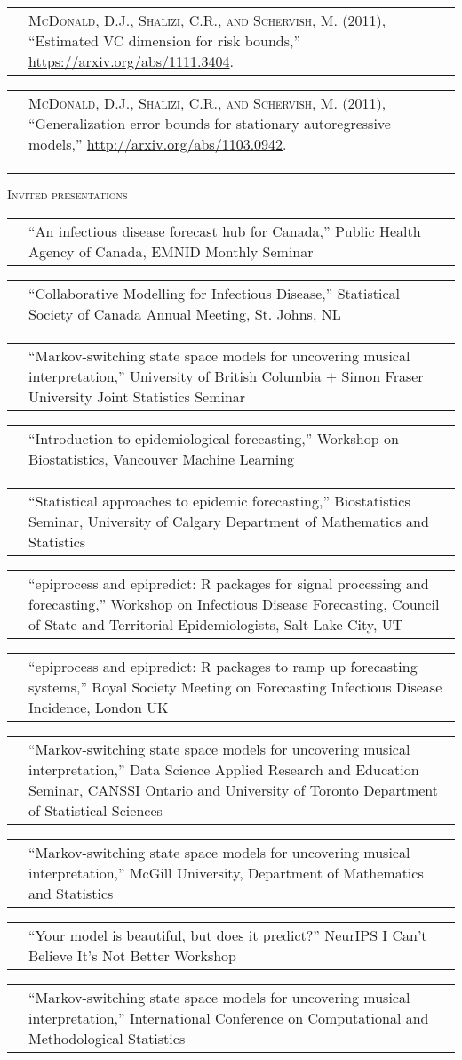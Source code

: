 \documentclass[11pt,letterpaper]{minimal/moderncv}
\makeatletter
\renewcommand{\section}[1]{  \par\addvspace{15pt}%
  \parbox[t]{\hintscolumnwidth}{\strut\raggedleft\raisebox{4pt}%
  {\rule{\hintscolumnwidth}{2pt}}}%
  \hspace{\separatorcolumnwidth}%
  \textsc{\Large #1}\par\nobreak\addvspace{6pt}%
}
\renewcommand*{\cvitem}[2]{%
  \begin{tabular}{@{}p{\hintscolumnwidth}@{\hspace{\separatorcolumnwidth}}%
    p{\maincolumnwidth}@{}}%
    \raggedleft {#1} &  {#2}%
  \end{tabular}%
}
\makeatother
\begin{document}
\cvitem{}{{\scshape McDonald, D.J., Shalizi, C.R., and Schervish, M.} (2011),
``Estimated VC dimension for risk bounds,''
\url{https://arxiv.org/abs/1111.3404}.\vspace*{6pt}}

\cvitem{}{{\scshape McDonald, D.J., Shalizi, C.R., and Schervish, M.} (2011),
``Generalization error bounds for stationary autoregressive models,''
\url{http://arxiv.org/abs/1103.0942}.}


    

\section{Invited presentations}

\cvitem{2024}{``An infectious disease forecast hub for Canada,'' Public Health 
  Agency of Canada, EMNID Monthly Seminar}
\cvitem{}{``Collaborative Modelling for Infectious Disease,'' Statistical Society of Canada Annual Meeting, St. Johns, NL}
\cvitem{}{``Markov-switching state space models for uncovering musical 
  interpretation,'' University of British Columbia $+$ Simon Fraser University
  Joint Statistics Seminar}
\cvitem{}{``Introduction to epidemiological forecasting,'' Workshop on Biostatistics,
  Vancouver Machine Learning}

\cvitem{2023}{``Statistical approaches to epidemic forecasting,'' Biostatistics 
  Seminar, University of Calgary Department of Mathematics and Statistics}
\cvitem{}{``epiprocess and epipredict: R packages for signal processing and forecasting,'' Workshop on Infectious Disease Forecasting, Council of State and Territorial Epidemiologists, Salt Lake City, UT}
\cvitem{}{``epiprocess and epipredict: R packages to ramp up forecasting systems,'' Royal Society Meeting on Forecasting Infectious Disease Incidence, London UK}

\cvitem{2022}{``Markov-switching state space models for uncovering musical
  interpretation,'' Data Science Applied Research and Education Seminar, CANSSI
  Ontario and University of Toronto Department of Statistical Sciences}
\cvitem{}{``Markov-switching state space models for uncovering musical
  interpretation,'' McGill University, Department of Mathematics and Statistics}


\cvitem{2021}{``Your model is beautiful, but does it predict?'' NeurIPS
  I Can't Believe It's Not Better Workshop}
\cvitem{}{``Markov-switching state space models for uncovering musical
  interpretation,'' International Conference on Computational and
  Methodological Statistics}
\end{document}
